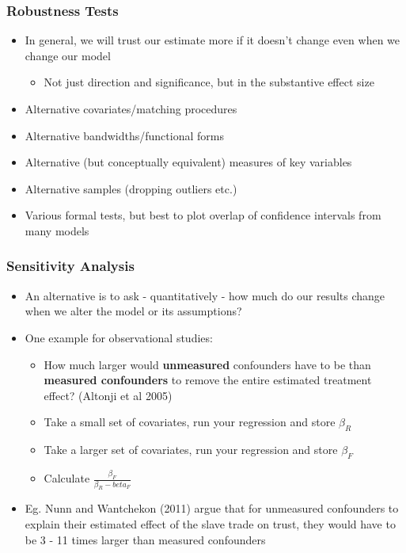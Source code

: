 \documentclass[xcolor=x11names,compress]{beamer}\usepackage[]{graphicx}\usepackage[]{color}
\renewcommand{\(}{\begin{columns}}
\renewcommand{\)}{\end{columns}}
\newcommand{\<}[1]{\begin{column}{#1}}
\renewcommand{\>}{\end{column}}
\begin{document}
\begin{frame}
\frametitle{Robustness Tests}
\begin{itemize}
\item In general, we will trust our estimate more if it doesn't change even when we change our model
\begin{itemize}
\item Not just direction and significance, but in the substantive effect size
\end{itemize}
\item Alternative covariates/matching procedures
\pause
\item Alternative bandwidths/functional forms
\pause
\item Alternative (but conceptually equivalent) measures of key variables
\pause
\item Alternative samples (dropping outliers etc.)
\pause
\item Various formal tests, but best to plot overlap of confidence intervals from many models
\end{itemize}
\end{frame}

\begin{frame}
\frametitle{Sensitivity Analysis}
\begin{itemize}
\item An alternative is to ask - quantitatively - how much do our results change when we alter the model or its assumptions?
\pause
\item One example for observational studies:
\begin{itemize}
\item How much larger would \textbf{unmeasured} confounders have to be than \textbf{measured confounders} to remove the entire estimated treatment effect? (Altonji et al 2005)
\pause
\item Take a small set of covariates, run your regression and store $\beta_R$
\pause
\item Take a larger set of covariates, run your regression and store $\beta_F$ 
\pause
\item Calculate $\frac{\beta_F}{\beta_R - beta_F}$
\end{itemize}
\item Eg. Nunn and Wantchekon (2011) argue that for unmeasured confounders to explain their estimated effect of the slave trade on trust, they would have to be 3 - 11 times larger than measured confounders
\end{itemize}
\end{frame}
\end{document}
